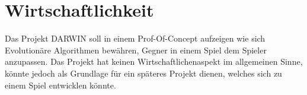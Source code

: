 \documentclass{scrartcl}
\begin{document}
	
	\section{Wirtschaftlichkeit}
	Das Projekt DARWIN soll in einem Prof-Of-Concept aufzeigen wie sich Evolutionäre Algorithmen bewähren, Gegner in einem Spiel dem Spieler anzupassen. Das Projekt hat keinen Wirtschaftlichenaspekt im allgemeinen Sinne, könnte jedoch als Grundlage für ein späteres Projekt dienen, welches sich zu einem Spiel entwicklen könnte.
	
\end{document}
